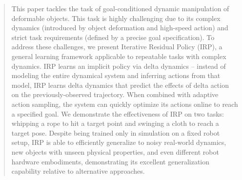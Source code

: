 \documentclass[conference]{IEEEtran}
\begin{document}
\begin{abstract}
This paper tackles the task of goal-conditioned dynamic manipulation of deformable objects. This task is highly challenging due to its complex dynamics (introduced by object deformation and high-speed action) and strict task requirements (defined by a precise goal specification). To address these challenges, we present Iterative Residual Policy (IRP), a general learning framework applicable to repeatable tasks with complex dynamics. IRP learns an implicit policy via delta dynamics -- instead of modeling the entire dynamical system and inferring actions from that model, IRP learns delta dynamics that predict the effects of delta action on the previously-observed trajectory. When combined with adaptive action sampling, the system can quickly optimize its actions online to reach a specified goal. We demonstrate the effectiveness of IRP on two tasks: whipping a rope to hit a target point and swinging a cloth to reach a target pose. Despite being trained only in simulation on a fixed robot setup, IRP is able to efficiently generalize to noisy real-world dynamics, new objects with unseen physical properties, and even different robot hardware embodiments, demonstrating its excellent generalization capability relative to alternative approaches. 

\end{abstract}
\end{document}
